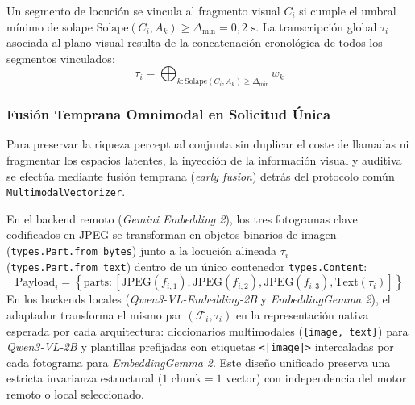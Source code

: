 Un segmento de locución se vincula al fragmento visual $C_i$ si cumple el umbral mínimo de solape $\text{Solape}(C_i, A_k) \ge \Delta_{\min} = 0,2\text{ s}$. La transcripción global $\tau_i$ asociada al plano visual resulta de la concatenación cronológica de todos los segmentos vinculados:
\begin{equation}
    \tau_i = \bigoplus_{k: \text{Solape}(C_i, A_k) \ge \Delta_{\min}} w_k
\end{equation}

\subsubsection{Fusión Temprana Omnimodal en Solicitud Única}
Para preservar la riqueza perceptual conjunta sin duplicar el coste de llamadas ni fragmentar los espacios latentes, la inyección de la información visual y auditiva se efectúa mediante fusión temprana (\textit{early fusion}) detrás del protocolo común \texttt{MultimodalVectorizer}.

En el backend remoto (\textit{Gemini Embedding 2}), los tres fotogramas clave codificados en JPEG se transforman en objetos binarios de imagen (\texttt{types.Part.from\_bytes}) junto a la locución alineada $\tau_i$ (\texttt{types.Part.from\_text}) dentro de un único contenedor \texttt{types.Content}:
\begin{equation}
    \text{Payload}_i = \left\{ \text{parts}: \left[ \text{JPEG}(f_{i,1}), \text{JPEG}(f_{i,2}), \text{JPEG}(f_{i,3}), \text{Text}(\tau_i) \right] \right\}
\end{equation}
En los backends locales (\textit{Qwen3-VL-Embedding-2B} y \textit{EmbeddingGemma 2}), el adaptador transforma el mismo par $(\mathcal{F}_i, \tau_i)$ en la representación nativa esperada por cada arquitectura: diccionarios multimodales (\texttt{\{image, text\}}) para \textit{Qwen3-VL-2B} y plantillas prefijadas con etiquetas \texttt{<|image|>} intercaladas por cada fotograma para \textit{EmbeddingGemma 2}. Este diseño unificado preserva una estricta invarianza estructural ($1\text{ chunk} = 1\text{ vector}$) con independencia del motor remoto o local seleccionado.
